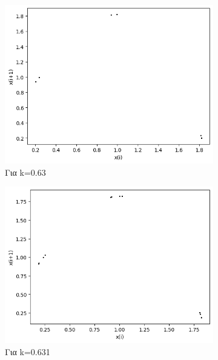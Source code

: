 \begin{figure}[h!]
\begin{subfigure}[b]{0.25\textwidth}
		\includegraphics[width=\textwidth]{LateX images/graphs q07/g11}
		\caption{Για k=0.63}
		\label{f:k45}
	\end{subfigure}
	\hfill
	\begin{subfigure}[b]{0.25\textwidth}
		\centering
		\includegraphics[width=\textwidth]{LateX images/graphs q07/g12}
		\caption{Για k=0.631}
		\label{f:k46}
	\end{subfigure}
	\hfill
	\begin{subfigure}[b]{0.25\textwidth}
	\centering

\end{subfigure}
\end{figure}
